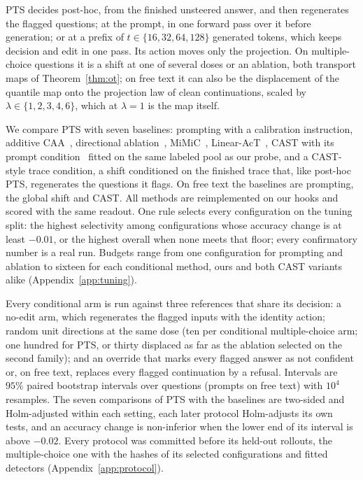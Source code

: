 \documentclass{article}
\begin{document}
PTS decides post-hoc, from the finished unsteered answer, and then regenerates
the flagged questions; at the prompt, in one forward pass over it before
generation; or at a prefix of $t\in\{16,32,64,128\}$ generated tokens, which
keeps decision and edit in one pass. Its action moves only the projection. On
multiple-choice questions it is a shift at one of several doses or an
ablation, both transport maps of Theorem~\ref{thm:ot}; on free text it can
also be the displacement of the quantile map onto the projection law of clean
continuations, scaled by $\lambda\in\{1,2,3,4,6\}$, which at $\lambda=1$ is
the map itself.

We compare PTS with seven baselines: prompting with a calibration instruction,
additive CAA~\citep{rimsky2024caa}, directional
ablation~\citep{arditi2024refusal}, MiMiC~\citep{singh2024mimic},
Linear-AcT~\citep{rodriguez2025act}, CAST with its prompt
condition~\citep{lee2024cast} fitted on the same labeled pool as our probe, and
a CAST-style trace condition, a shift conditioned on the finished trace that,
like post-hoc PTS, regenerates the questions it flags. On free text the
baselines are prompting, the global shift and CAST. All methods are
reimplemented on our hooks and scored with the same readout. One rule selects
every configuration on the tuning split: the highest selectivity among
configurations whose accuracy change is at least $-0.01$, or the highest
overall when none meets that floor; every confirmatory number is a real run.
Budgets range from one configuration for prompting and ablation to sixteen
for each conditional method, ours and both CAST variants alike
(Appendix~\ref{app:tuning}).

Every conditional arm is run against three references that share its decision:
a no-edit arm, which regenerates the flagged inputs with the identity action;
random unit directions at the same dose (ten per conditional multiple-choice
arm; one hundred for PTS, or thirty displaced as far as the ablation selected
on the second family); and an override that marks every flagged answer as not
confident or, on free text, replaces every flagged continuation by a refusal.
Intervals are $95\%$ paired bootstrap intervals over questions (prompts on free
text) with $10^4$ resamples. The seven comparisons of PTS with the baselines
are two-sided and Holm-adjusted within each setting, each later protocol
Holm-adjusts its own tests, and an accuracy change is non-inferior when the
lower end of its interval is above $-0.02$. Every protocol was committed before
its held-out rollouts, the multiple-choice one with the hashes of its selected
configurations and fitted detectors (Appendix~\ref{app:protocol}).
\end{document}
